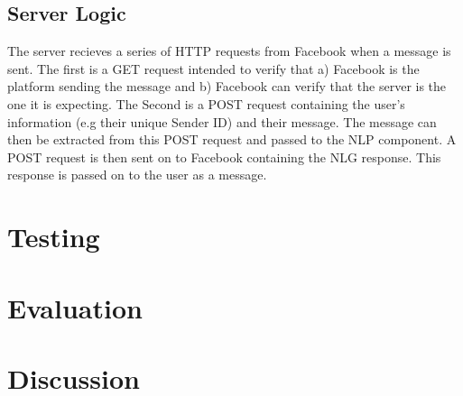 \documentclass[12pt,a4paper]{article}
\begin{document}
    \subsection{Server Logic}
    The server recieves a series of HTTP requests from Facebook when a message is sent. The first is a GET request intended to verify that a) Facebook is the platform sending the message and b) Facebook can verify that the server is the one it is expecting. The Second is a POST request containing the user's information (e.g their unique Sender ID) and their message. The message can then be extracted from this POST request and passed to the NLP component. A POST request is then sent on to Facebook containing the NLG response. This response is passed on to the user as a message.
    
    \section{Testing}
    \section{Evaluation}
    \section{Discussion}
\end{document}
